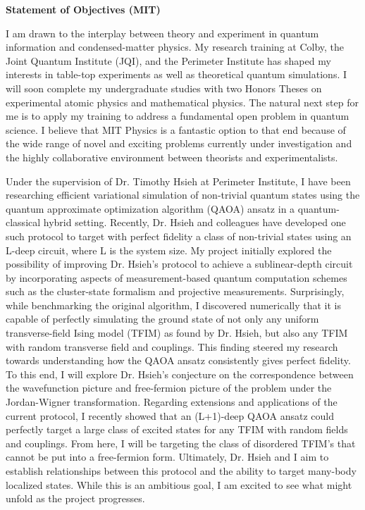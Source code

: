 \documentclass[12pt]{article}
\begin{document}
	
	
\begin{center}
	\textbf{Statement of Objectives (MIT)}
\end{center}\vspace{-3pt}
I am drawn to the interplay between theory and experiment in quantum information and condensed-matter physics. My research training at Colby, the Joint Quantum Institute (JQI), and the Perimeter Institute has shaped my interests in table-top experiments as well as theoretical quantum simulations. I will soon complete my undergraduate studies with two Honors Theses on experimental atomic physics and mathematical physics. The natural next step for me is to apply my training to address a fundamental open problem in quantum science. I believe that MIT Physics is a fantastic option to that end because of the wide range of novel and exciting problems currently under investigation and the highly collaborative environment between theorists and experimentalists.   \\ \vspace{-9pt}

Under the supervision of Dr. Timothy Hsieh at Perimeter Institute, I have been researching efficient variational simulation of non-trivial quantum states using the quantum approximate optimization algorithm (QAOA) ansatz in a quantum-classical hybrid setting. Recently, Dr. Hsieh and colleagues have developed one such protocol to target with perfect fidelity a class of non-trivial states using an L-deep circuit, where L is the system size. My project initially explored the possibility of improving Dr. Hsieh's protocol to achieve a sublinear-depth circuit by incorporating aspects of measurement-based quantum computation schemes such as the cluster-state formalism and projective measurements. Surprisingly, while benchmarking the original algorithm, I discovered numerically that it is capable of perfectly simulating the ground state of not only any uniform transverse-field Ising model (TFIM) as found by Dr. Hsieh, but also any TFIM with random transverse field and couplings. This finding steered my research towards understanding how the QAOA ansatz consistently gives perfect fidelity. To this end, I will explore Dr. Hsieh's conjecture on the correspondence between the wavefunction picture and free-fermion picture of the problem under the Jordan-Wigner transformation. Regarding extensions and applications of the current protocol, I recently showed that an (L+1)-deep QAOA ansatz could perfectly target a large class of excited states for any TFIM with random fields and couplings. From here, I will be targeting the class of disordered TFIM's that cannot be put into a free-fermion form. Ultimately, Dr. Hsieh and I aim to establish relationships between this protocol and the ability to target many-body localized states. While this is an ambitious goal, I am excited to see what might unfold as the project progresses. \\ \vspace{-9pt}
\end{document}
